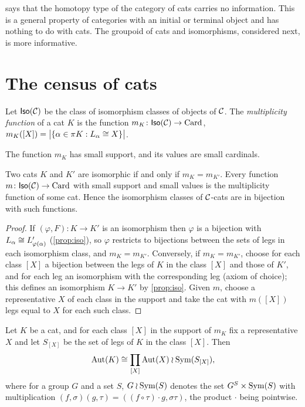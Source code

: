 \begin{remark}\label{rem:nerve-honest}
 says that the homotopy type of the category of cats
carries no information. This is a general property of categories with an
initial or terminal object and has nothing to do with cats. The groupoid of
cats and isomorphisms, considered next, is more informative.
\end{remark}

\section{The census of cats}\label{sec:census}

\begin{definition}\label{def:multiplicity}
Let $\mathsf{Iso}(\mathcal{C})$ be the class of isomorphism classes of objects of $\mathcal{C}$. The
\emph{multiplicity function} of a cat $K$ is the function
$m_K\colon\mathsf{Iso}(\mathcal{C})\to\mathrm{Card}$,
$m_K([X])=\bigl|\{\alpha\in\pi K:L_\alpha\cong X\}\bigr|$.
\end{definition}

The function $m_K$ has small support, and its values are small cardinals.

\begin{theorem}[Census]\label{thm:census}
Two cats $K$ and $K'$ are isomorphic if and only if $m_K=m_{K'}$. Every function
$m\colon\mathsf{Iso}(\mathcal{C})\to\mathrm{Card}$ with small support and small values is the
multiplicity function of some cat. Hence the isomorphism classes of
$\mathcal{C}$-cats are in bijection with such functions.
\end{theorem}

\begin{proof}
If $(\varphi,F)\colon K\to K'$ is an isomorphism then $\varphi$ is a bijection
with $L_\alpha\cong L'_{\varphi(\alpha)}$ (\cref{prop:iso}), so $\varphi$ restricts
to bijections between the sets of legs in each isomorphism class, and
$m_K=m_{K'}$. Conversely, if $m_K=m_{K'}$, choose for each class $[X]$ a
bijection between the legs of $K$ in the class $[X]$ and those of $K'$, and for
each leg an isomorphism with the corresponding leg (axiom of choice); this
defines an isomorphism $K\to K'$ by \cref{prop:iso}. Given $m$, choose a
representative $X$ of each class in the support and take the cat with $m([X])$
legs equal to $X$ for each such class.
\end{proof}

\begin{theorem}\label{thm:automorphism}
Let $K$ be a cat, and for each class $[X]$ in the support of $m_K$ fix a
representative $X$ and let $S_{[X]}$ be the set of legs of $K$ in the class
$[X]$. Then
\[
\mathrm{Aut}(K)\cong\prod_{[X]}\mathrm{Aut}(X)\wr\mathrm{Sym}(S_{[X]}),
\]
where for a group $G$ and a set $S$, $G\wr\mathrm{Sym}(S)$ denotes the set
$G^S\times\mathrm{Sym}(S)$ with multiplication $(f,\sigma)(g,\tau)=((f\circ\tau)\cdot g,\sigma\tau)$,
the product $\cdot$ being pointwise.
\end{theorem}

